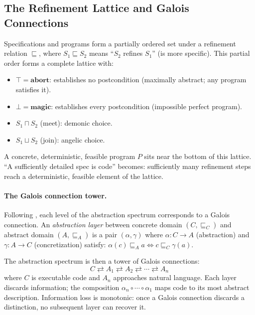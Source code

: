 \documentclass[11pt, a4paper, logo, copyright]{googledeepmind}
\begin{document}
\subsection{The Refinement Lattice and Galois Connections}

Specifications and programs form a partially ordered set under a refinement relation $\sqsubseteq$, where $S_1 \sqsubseteq S_2$ means ``$S_2$ refines $S_1$'' (is more specific). This partial order forms a complete lattice \citep{back1980correctness, morgan1994programming} with:

\begin{itemize}[nosep]
    \item $\top = \mathbf{abort}$: establishes no postcondition (maximally abstract; any program satisfies it).
    \item $\bot = \mathbf{magic}$: establishes every postcondition (impossible perfect program).
    \item $S_1 \sqcap S_2$ (meet): demonic choice.
    \item $S_1 \sqcup S_2$ (join): angelic choice.
\end{itemize}

A concrete, deterministic, feasible program $P$ sits near the bottom of this lattice. ``A sufficiently detailed spec is code'' becomes: sufficiently many refinement steps reach a deterministic, feasible element of the lattice.

\paragraph{The Galois connection tower.} Following \citet{cousot1977abstract}, each level of the abstraction spectrum corresponds to a Galois connection. An \emph{abstraction layer} between concrete domain $(C, \sqsubseteq_C)$ and abstract domain $(A, \sqsubseteq_A)$ is a pair $(\alpha, \gamma)$ where $\alpha: C \to A$ (abstraction) and $\gamma: A \to C$ (concretization) satisfy: $\alpha(c) \sqsubseteq_A a \iff c \sqsubseteq_C \gamma(a)$.

The abstraction spectrum is then a tower of Galois connections:
\begin{equation}
    C \rightleftarrows A_1 \rightleftarrows A_2 \rightleftarrows \cdots \rightleftarrows A_n
\end{equation}
where $C$ is executable code and $A_n$ approaches natural language. Each layer discards information; the composition $\alpha_n \circ \cdots \circ \alpha_1$ maps code to its most abstract description. Information loss is monotonic: once a Galois connection discards a distinction, no subsequent layer can recover it.
\end{document}
